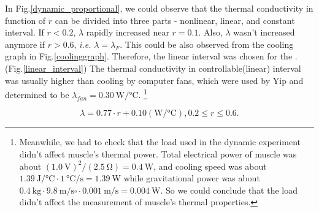 In Fig.\ref{dynamic_proportional}, we could observe that the thermal conductivity in function of $r$ can be divided into three parts - nonlinear, linear, and constant interval. If $r<0.2$, $\lambda$ rapidly increased near $r=0.1$. Also, $\lambda$ wasn't increased anymore if $r>0.6$, {\it i.e.} $\lambda = \lambda_{F}$. This could be also observed from the cooling graph in Fig.\ref{coolinggraph}.
Therefore, the linear interval was chosen for the \Apcnospace.(Fig.\ref{linear_interval}) The thermal conductivity in controllable(linear) interval was usually higher than cooling by computer fans, which were used by Yip \etalspace and determined to be $\lambda_{fan}=\SI{0.30}{\watt\per\degreeCelsius}$.
\footnote{
	Meanwhile, we had to check that the load used in the dynamic experiment didn't affect muscle's thermal power. 
	Total electrical power of muscle was about $(\SI{1.0}{\volt})^2/(\SI{2.5}{\ohm})=\SI{0.4}{\watt}$, and cooling speed was about $\SI{1.39}{\joule\per\degreeCelsius} \cdot \SI{1}{\degreeCelsius\per\second}=\SI{1.39}{\watt}$ while gravitational power was about  $\SI{0.4}{\kilo\gram} \cdot  \SI{9.8}{\meter\per\second\square} \cdot \SI{0.001}{\meter\per\second}=\SI{0.004}{\watt}$. So we could conclude that the load didn't affect the measurement of muscle's thermal properties.
}

\begin{equation} \label{lambda_control}
\lambda = 0.77\cdot r + 0.10 (\si{\watt\per\degreeCelsius}), 0.2\leq r \leq 0.6.
\end{equation}





